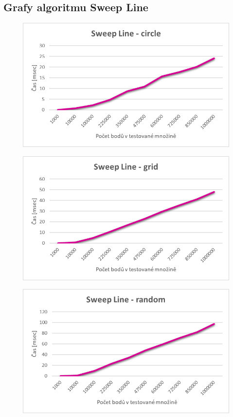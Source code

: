 \documentclass[a4paper, 12pt]{article}
\begin{document}
\clearpage
\subsection{Grafy algoritmu Sweep Line}
\begin{figure}[h!]
	\centering
	\includegraphics[width=15cm]{grafy/sl_circle.png}
\end{figure}

\begin{figure}[h!]
	\centering
	\includegraphics[width=15cm]{grafy/sl_grid.png}
\end{figure}

\clearpage
\begin{figure}[h!]
	\centering
	\includegraphics[width=15cm]{grafy/sl_random.png}
\end{figure}
\end{document}
